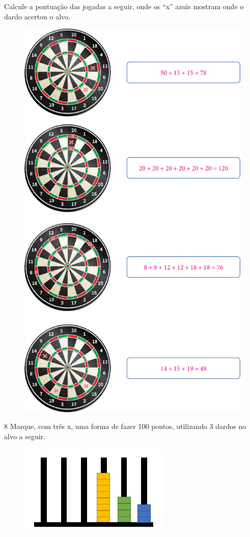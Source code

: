 \pagebreak
Calcule a pontuação das jogadas a seguir, onde os ``x'' azuis mostram onde o dardo acertou o alvo.


\begin{figure}[htpb!]
\includegraphics[width=.7\textwidth]{./media/image25.png}
\end{figure}

\pagebreak

\num{8} Marque, com três x, uma forma de fazer 100 pontos, utilizando 3 dardos no alvo a seguir.

\begin{figure}[htpb!]
\centering
\includegraphics[width=.5\textwidth]{./media/image26.png}
\end{figure}

